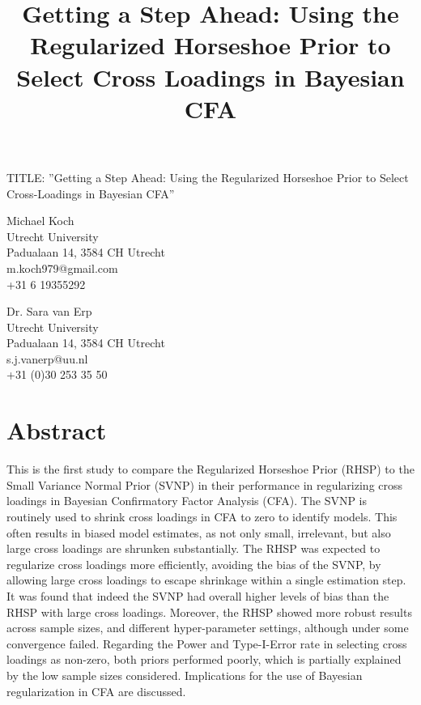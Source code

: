 \documentclass[
  man, donotrepeattitle,floatsintext]{apa6}
\title{Getting a Step Ahead: Using the Regularized Horseshoe Prior to Select Cross Loadings in Bayesian CFA}
\author{\phantom{0}}
\date{}
\affiliation{\phantom{0}}
\begin{document}
\maketitle

\thispagestyle{empty}
\addtocounter{page}{-1}

\begin{center}
TITLE: ”Getting a Step Ahead: Using the Regularized Horseshoe
Prior to Select Cross-Loadings in Bayesian CFA”
\end{center}

\vspace{1cm}

Michael Koch \\
Utrecht University \\
Padualaan 14, 3584 CH Utrecht \\
m.koch979@gmail.com \\
+31 6 19355292

\vspace{1cm}

Dr. Sara van Erp \\
Utrecht University \\
Padualaan 14, 3584 CH Utrecht \\
s.j.vanerp@uu.nl \\
+31 (0)30 253 35 50

\clearpage

\setcounter{page}{0}
\thispagestyle{empty}
\pagestyle{fancy}

\clearpage

\section{Abstract}\label{abstract}

This is the first study to compare the Regularized Horseshoe Prior
(RHSP) to the Small Variance Normal Prior (SVNP) in their performance in
regularizing cross loadings in Bayesian Confirmatory Factor Analysis (CFA). The SVNP is routinely used to
shrink cross loadings in CFA to zero to identify models. This often
results in biased model estimates, as not only small, irrelevant, but
also large cross loadings are shrunken substantially. The RHSP was
expected to regularize cross loadings more efficiently, avoiding the
bias of the SVNP, by allowing large cross loadings to escape shrinkage
within a single estimation step. It was found that indeed the SVNP had
overall higher levels of bias than the RHSP with large cross loadings.
Moreover, the RHSP showed more robust results across sample sizes, and different
hyper-parameter settings, although under some convergence failed.
Regarding the Power and Type-I-Error rate in selecting cross loadings as
non-zero, both priors performed poorly, which is partially explained by
the low sample sizes considered. Implications for the use of Bayesian regularization in CFA are discussed.
\end{document}
